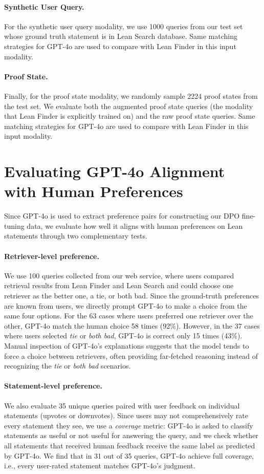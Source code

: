 \documentclass{article} %
\begin{document}
\paragraph{Synthetic User Query.}
For the synthetic user query modality, we use 1000 queries from our test set whose ground truth statement is in Lean Search database.
Same matching strategies for GPT-4o are used to compare with Lean Finder in this input modality.

\paragraph{Proof State.}
Finally, for the proof state modality, we randomly sample 2224 proof states from the test set. We evaluate both the augmented proof state queries (the modality that Lean Finder is explicitly trained on) and the raw proof state queries. Same matching strategies for GPT-4o are used to compare with Lean Finder in this input modality.


\section{Evaluating GPT-4o Alignment with Human Preferences}
\label{sec:gpt4oalignment}

Since GPT-4o is used to extract preference pairs for constructing our DPO fine-tuning data, we evaluate how well it aligns with human preferences on Lean statements through two complementary tests.

\paragraph{Retriever-level preference.}  
We use 100 queries collected from our web service, where users compared retrieval results from Lean Finder and Lean Search and could choose one retriever as the better one, a tie, or both bad. Since the ground-truth preferences are known from users, we directly prompt GPT-4o to make a choice from the same four options. For the 63 cases where users preferred one retriever over the other, GPT-4o match the human choice 58 times (92\%). However, in the 37 cases where users selected \emph{tie} or \emph{both bad}, GPT-4o is correct only 15 times (43\%). Manual inspection of GPT-4o’s explanations suggests that the model tends to force a choice between retrievers, often providing far-fetched reasoning instead of recognizing the \emph{tie} or \emph{both bad} scenarios.  

\paragraph{Statement-level preference.}  
We also evaluate 35 unique queries paired with user feedback on individual statements (upvotes or downvotes). Since users may not comprehensively rate every statement they see, we use a \emph{coverage} metric: GPT-4o is asked to classify statements as useful or not useful for answering the query, and we check whether all statements that received human feedback receive the same label as predicted by GPT-4o. We find that in 31 out of 35 queries, GPT-4o achieve full coverage, i.e., every user-rated statement matches GPT-4o’s judgment.  
\end{document}
